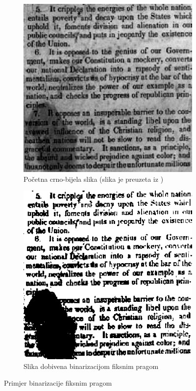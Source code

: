 \documentclass[times, utf8, zavrsni, numeric]{fer}
\begin{document}
\begin{figure}[th!]
    \centering
    \begin{subfigure}{.5\textwidth}
        \centering
        \includegraphics[width=.85\linewidth]{Images/Grayscale.png}
        \captionsetup{justification=centering}
        \caption{Početna crno-bijela slika (slika je preuzeta iz \cite{AdaptiveBinarization})}
        \label{fig:sub1}
    \end{subfigure}%
    \begin{subfigure}{.5\textwidth}
        \centering
        \includegraphics[width=.85\linewidth]{Images/Threshold.png}
        \caption{Slika dobivena binarizacijom fiksnim pragom}
        \label{fig:sub2}
    \end{subfigure}
    \caption{Primjer binarizacije fiksnim pragom}
    \label{fig:threshold}
\end{figure}
\end{document}

